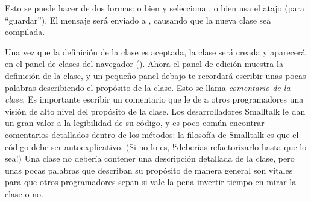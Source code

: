 \documentclass[a4paper,10pt,twoside]{book}
\begin{document}
Esto se puede hacer de dos formas: o bien \actclick y selecciona , o bien
usa el atajo  (para ``guardar'').
El mensaje ser\'a enviado a , causando que la nueva clase sea compilada.

Una vez que la definici\'on de la clase es aceptada, la clase ser\'a creada y aparecer\'a en el panel de clases del navegador ().
Ahora el panel de edici\'on muestra la definici\'on de la clase, y un pequeño panel debajo te recordar\'a escribir unas pocas palabras describiendo el prop\'osito de la clase. Esto se llama \emph {comentario de la clase}. Es importante escribir un comentario que le de a otros programadores una visi\'on de alto nivel del prop\'osito de la clase.
Los desarrolladores Smalltalk le dan un gran valor a la legibilidad de su c\'odigo, y es poco com\'un encontrar comentarios detallados dentro de los m\'etodos: la filosof\'ia de Smalltalk es que el c\'odigo debe ser autoexplicativo. (Si no lo es, !`deber\'ias refactorizarlo hasta que lo sea!) Una clase  no deber\'ia contener una descripci\'on detallada de la clase, pero unas pocas palabras que describan su prop\'osito de manera general son vitales para que otros programadores sepan si vale la pena invertir tiempo en mirar la clase o no.

\end{document}

